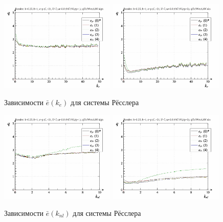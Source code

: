 \begin{figure}[ht!]
\begin{center}
  \includegraphics[width=0.49\textwidth]{p/cha/ross/ross_id-p_k_e_ql3rlWvnAAW_sign.png}
  \hfill
  \includegraphics[width=0.49\textwidth]{p/cha/ross/ross_id-p_k_e_ql3rlWvnAAW_sin.png}
\end{center}
  \caption{Зависимости $\bar{e}(k_e)$ для системы Рёсслера}
\label{atu:f:ross_e_k_e}
\end{figure}

\begin{figure}[ht!]
\begin{center}
  \includegraphics[width=0.49\textwidth]{p/cha/ross/ross_id-p_k_nl_ql3rlWvnAAW_sign.png}
  \hfill
  \includegraphics[width=0.49\textwidth]{p/cha/ross/ross_id-p_k_nl_ql3rlWvnAAW_sin.png}
\end{center}
  \caption{Зависимости $\bar{e}(k_{nl})$ для системы Рёсслера}
\label{atu:f:ross_e_k_nl}
\end{figure}

